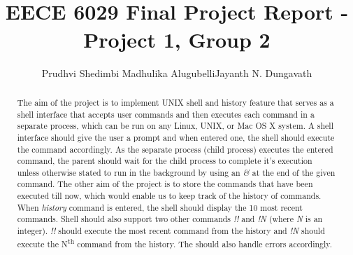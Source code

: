 \documentclass[12pt,twoside]{article}
\title{\textbf{\doctitle}\\
EECE 6029 Final Project Report - Project 1, Group 2}
\author{Prudhvi Shedimbi \hspace{1cm}Madhulika Alugubelli\hspace{1cm}Jayanth N. Dungavath}
\begin{document}
\maketitle
\pagebreak

\begin{abstract}
The aim of the project is to implement UNIX shell and history feature that serves as a shell interface that accepts user commands and then executes each command in a separate process, which can be run on any Linux, UNIX, or Mac OS X system. A shell interface should give the user a prompt and when entered one, the shell should execute the command accordingly. As the separate process (child process) executes the entered command, the parent should wait for the child process to complete it's execution unless otherwise stated to run in the background by using an \emph{\&} at the end of the given command. The other aim of the project is to store the commands that have been executed till now, which would enable us to keep track of the history of commands. When \emph{history} command is entered, the shell should display the 10 most recent commands. Shell should also support two other commands \emph{!!} and \emph{!N} (where \emph{N} is an integer). \emph{!!} should execute the most recent command from the history and \emph{!N} should execute the N\textsuperscript{th} command from the history. The should also handle errors accordingly.
\end{abstract}

\hfill \break
\hfill \break
\hfill \break
\hfill \break
\hfill \break
\hfill \break
\hfill \break
\hfill \break
\hfill \break
\hfill \break
\hfill \break
\hfill \break
\hfill \break
\hfill \break
\hfill \break
\hfill \break
\hfill \break
\hfill \break
\hfill \break
\hfill \break
\hfill \break
\hfill \break
\hfill \break
\hfill \break
\hfill \break
\hfill \break
\pagebreak

\tableofcontents
\thispagestyle{empty}


\hfill \break
\hfill \break
\hfill \break
\hfill \break
\hfill \break
\hfill \break
\hfill \break
\hfill \break
\hfill \break
\hfill \break
\hfill \break
\hfill \break
\hfill \break
\hfill \break
\hfill \break
\hfill \break
\hfill \break
\hfill \break
\hfill \break
\hfill \break
\hfill \break
\hfill \break
\hfill \break
\hfill \break
\hfill \break
\hfill \break
\hfill \break
\pagebreak

\graphicspath{ {/Users/jayanthdeejay/Desktop/} }
\end{document}
